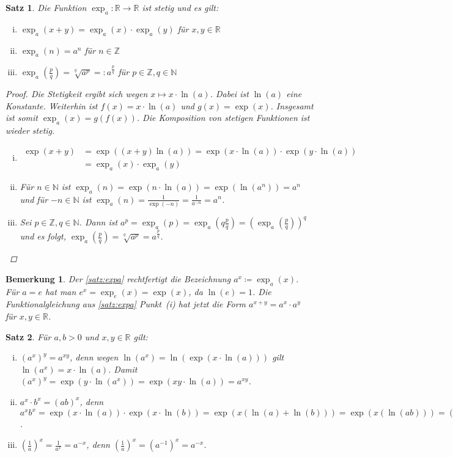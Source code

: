 \documentclass[ngerman,titlepage,twoside, parskip=half*]{scrreprt}
\newcommand*{\N}{\mathbb{N}}
\newcommand*{\Z}{\mathbb{Z}}
\newcommand*{\R}{\mathbb{R}}
\theoremstyle{break}
\newtheorem{theorem}{Satz}[section]
\theoremstyle{nonumberbreak}
\newtheorem{remark}{Bemerkung}
\newtheorem{proof}{Beweis:}
\begin{document}
\begin{theorem}\label{satz:expa}
  Die Funktion $\exp_a \colon\R\rightarrow\R$ ist stetig und es gilt:
  \begin{enumerate}[(i)]
  \item $\exp_a(x+y)=\exp_a(x)\cdot \exp_a(y)$ für  $x,y \in \R$
  \item $\exp_a(n)=a^n$ für $n\in \Z$
  \item $\exp_a (\frac{p}{q})= \sqrt[q]{a^p}=\colon a^{\frac{p}{q}}$
    für $p\in \Z , q\in \N$
  \end{enumerate}
  \begin{proof}
    Die Stetigkeit ergibt sich wegen $x \mapsto x \cdot \ln (a)$. Dabei
    ist $\ln(a)$ eine Konstante. Weiterhin ist $f(x)=x\cdot \ln(a)$
    und $g(x)=\exp(x)$. Insgesamt ist somit $\exp_a(x)=g(f(x))$. Die
    Komposition von stetigen Funktionen ist wieder stetig.
    \begin{enumerate}[i)]
    \item \begin{align*}
        \exp(x+y) & = \exp((x+y)\ln (a))= \exp(x \cdot \ln (a))\cdot
        \exp(y\cdot \ln(a))\\
        & = \exp_a(x)\cdot \exp_a(y)
      \end{align*}
    \item Für $n\in \N$ ist $\exp_a (n)=\exp(n\cdot \ln(a))=
      \exp(\ln(a^n))= a^n$ und für $-n\in \N$ ist
      $\exp_a(n)=\frac{1}{\exp(-n)} =\frac{1}{a^{-n}}=a^n$.
    \item Sei $p\in \Z, q\in \N$. Dann ist $a^p=\exp_a(p)=
      \exp_a(q\frac{p}{q})= \left(\exp_a(\frac{p}{q})\right)^q$ und es
      folgt, $\exp_a(\frac{p}{q})=\sqrt[q]{a^p}=a^{\frac{p}{q}}$.
    \end{enumerate}
  \end{proof}
\end{theorem}

\begin{remark}
  Der \autoref{satz:expa} rechtfertigt die Bezeichnung $a^x\coloneqq
  \exp_a(x)$. Für $a=e$ hat man $e^x=\exp_e(x)=\exp(x)$, da
  $\ln(e)=1$. Die Funktionalgleichung aus \autoref{satz:expa} Punkt~(i) hat
  jetzt die Form $a^{x+y}=a^x\cdot a^y$ für $x,y\in \R$.
\end{remark}

\begin{theorem}
  Für $a,b>0$ und $x,y\in \R$ gilt:
  \begin{enumerate}[i)]
  \item $(a^x)^y=a^{xy}$, denn wegen $\ln(a^x)=\ln(\exp(x \cdot \ln(a)))$ gilt
    $\ln (a^x)=x \cdot \ln (a)$. Damit $(a^x)^y=\exp(y\cdot
    \ln(a^x))=\exp(xy\cdot \ln(a)) =a^{xy}$.
  \item $a^x\cdot b^x=(ab)^x$, denn $a^x b^x= \exp(x\cdot \ln(a))
    \cdot \exp(x\cdot \ln(b))= \exp(x(\ln(a)+\ln(b)))=
    \exp(x(\ln(ab)))= (ab)^x$.
  \item $(\frac{1}{a})^x=\frac{1}{a^x}=a^{-x}$, denn $(\frac{1}{a})^x=
    (a^{-1})^x=a^{-x}$.
  \end{enumerate}
\end{theorem}
\end{document}
